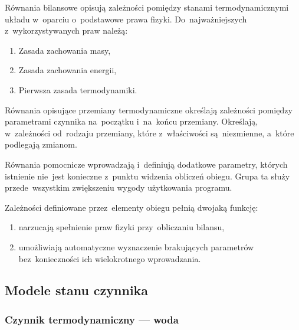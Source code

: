 Równania bilansowe opisują zależności pomiędzy stanami termodynamicznymi
układu w~oparciu o~podstawowe prawa fizyki. Do~najważniejszych
z~wykorzystywanych praw należą:

\begin{enumerate}

	\item Zasada zachowania masy,

	\item Zasada zachowania energii,

	\item Pierwsza zasada termodynamiki.

\end{enumerate}

Równania opisujące przemiany termodynamiczne określają zależności
pomiędzy parametrami czynnika na~początku i~na~końcu przemiany.
Określają, w~zależności od~rodzaju przemiany, które z~właściwości
są~niezmienne, a~które podlegają zmianom.

Równania pomocnicze wprowadzają i~definiują dodatkowe parametry, których
istnienie nie~jest konieczne z~punktu widzenia obliczeń obiegu. Grupa ta
służy przede~wszystkim zwiększeniu wygody użytkowania programu.

Zależności definiowane przez~elementy obiegu pełnią dwojaką funkcję:

\begin{enumerate}

	\item narzucają spełnienie praw fizyki przy~obliczaniu bilansu,

	\item umożliwiają automatyczne wyznaczenie brakujących parametrów
		bez~konieczności ich wielokrotnego wprowadzania.

\end{enumerate}


\subsection{Modele stanu czynnika}

\subsubsection{Czynnik termodynamiczny --- woda}

